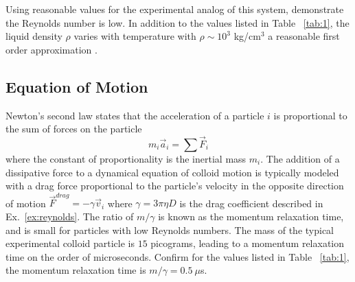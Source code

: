 \documentclass[twocolumn,preprintnumbers,amsmath,amssymb,aps,prx]{revtex4}
\begin{document}
  Using reasonable values for the
  experimental analog of this system, 
  demonstrate the Reynolds number is low.
  In addition to the values listed in Table ~\ref{tab:1}, 
  the liquid density $\rho$ varies with temperature
  with $\rho \sim 10^3$ kg/cm$^3$ a reasonable
  first order approximation
  \cite{asce}.
  


\label{ex:reynolds}

\subsection{Equation of Motion}
  \label{ex:n2l}
  
  Newton's second law states that
  the acceleration of a particle $i$
  is proportional to 
  the sum of forces on the particle 
  \begin{equation}
  m_i \vec{a}_i = \sum \vec{F}_i
  \label{eq:n2l}
  \end{equation}
  where the constant of proportionality is the
  inertial mass $m_i$.  
  The addition of a dissipative force to a dynamical equation 
  of colloid motion 
  is typically modeled
  with a drag force proportional to the particle's velocity
  in the opposite direction of motion 
  $\vec{F}^{drag} = - \gamma \vec{v}_i$
  where $\gamma = 3 \pi \eta D$ is the drag coefficient
  described in Ex.~\ref{ex:reynolds}.
  The ratio of $m/\gamma$ is %
  known as the momentum relaxation time, %
  and is small for
  particles with low Reynolds numbers.
  The mass of the
  typical experimental colloid particle is $15$ picograms,
  leading to a momentum relaxation time
  on the order of microseconds.
  Confirm for the values listed in Table ~\ref{tab:1},
  the momentum relaxation time is 
  $m/\gamma = 0.5 ~\mu$s. 
  
\end{document}
